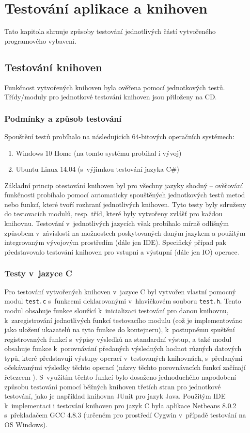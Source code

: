 \documentclass[czech,BP]{thesiskiv}
\begin{document}
\chapter{Testování aplikace a knihoven}
Tato kapitola shrnuje způsoby testování jednotlivých částí vytvořeného programového vybavení.
\section{Testování knihoven}
Funkčnost vytvořených knihoven byla ověřena pomocí jednotkových testů. Třídy/moduly pro jednotkové testování knihoven jsou přiloženy na CD.

\subsection{Podmínky a způsob testování}
Spouštění testů probíhalo na následujících 64-bitových operačních systémech:
\begin{enumerate}
\item{Windows 10 Home (na tomto systému probíhal i vývoj)}
\item{Ubuntu Linux 14.04 (s~výjimkou testování jazyka C\#)}
\end{enumerate}

Základní princip otestování knihoven byl pro všechny jazyky shodný -- ověřování funkčnosti probíhalo pomocí automaticky spouštěných jednotkových testů metod nebo funkcí, které tvoří rozhraní jednotlivých knihoven. Tyto testy byly sdruženy do testovacích modulů, resp. tříd, které byly vytvořeny zvlášť pro každou knihovnu. Testování v~jednotlivých jazycích však probíhalo mírně odlišným způsobem v~závislosti na možnostech poskytovaných daným jazykem a použitým integrovaným vývojovým prostředím (dále jen IDE). Specifický případ pak představovalo testování knihoven pro vstupní a výstupní (dále jen IO) operace.

\subsection{Testy v~jazyce C}
Pro testování vytvořených knihoven v~jazyce C byl vytvořen vlastní pomocný modul \texttt{test.c} s~funkcemi deklarovanými v~hlavičkovém souboru \texttt{test.h}. Tento modul obsahuje funkce sloužící k~inicializaci testování pro danou knihovnu, k~zaregistrování jednotlivých funkcí testovacího modulu (což je implementováno jako uložení ukazatelů na tyto funkce do kontejneru), k~postupnému spuštění registrovaných funkcí s~výpisy výsledků na standardní výstup, a také modul obsahuje funkce k~porovnávání předaných výsledných hodnot různých datových typů, které představují výstupy operací v~testovaných knihovnách, s~předanými očekávanými výsledky těchto operací (názvy těchto porovnávacích funkcí začínají řetezcem ). S~využitím těchto funkcí bylo dosaženo jednoduchého napodobení způsobu testování pomocí běžných knihoven třetích stran pro jednotkové testování, jako je například knihovna JUnit pro jazyk Java. Použitým IDE k~implementaci i testování knihoven pro jazyk C byla aplikace Netbeans 8.0.2 s~překladačem GCC 4.8.3 (určeném pro prostředí Cygwin v~případě testování na OS Windows).
\end{document}
